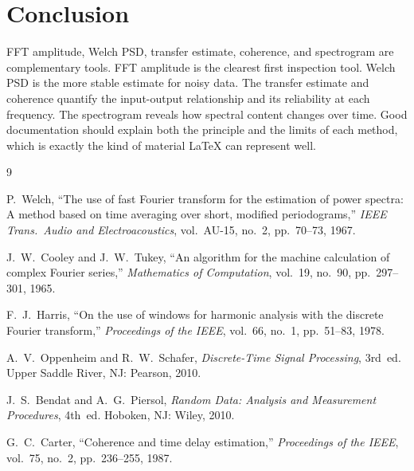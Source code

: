 \documentclass[11pt,a4paper]{article}
\begin{document}
\section{Conclusion}

FFT amplitude, Welch PSD, transfer estimate, coherence, and spectrogram are complementary tools. FFT amplitude is the clearest first inspection tool. Welch PSD is the more stable estimate for noisy data. The transfer estimate and coherence quantify the input-output relationship and its reliability at each frequency. The spectrogram reveals how spectral content changes over time. Good documentation should explain both the principle and the limits of each method, which is exactly the kind of material LaTeX can represent well.

\begin{thebibliography}{9}

P.~Welch,
``The use of fast Fourier transform for the estimation of power spectra: A method based on time averaging over short, modified periodograms,''
\emph{IEEE Trans.\ Audio and Electroacoustics}, vol.~AU-15, no.~2, pp.~70--73, 1967.

J.~W.~Cooley and J.~W.~Tukey,
``An algorithm for the machine calculation of complex Fourier series,''
\emph{Mathematics of Computation}, vol.~19, no.~90, pp.~297--301, 1965.

F.~J.~Harris,
``On the use of windows for harmonic analysis with the discrete Fourier transform,''
\emph{Proceedings of the IEEE}, vol.~66, no.~1, pp.~51--83, 1978.

A.~V.~Oppenheim and R.~W.~Schafer,
\emph{Discrete-Time Signal Processing}, 3rd~ed.
Upper Saddle River, NJ: Pearson, 2010.

J.~S.~Bendat and A.~G.~Piersol,
\emph{Random Data: Analysis and Measurement Procedures}, 4th~ed.
Hoboken, NJ: Wiley, 2010.

G.~C.~Carter,
``Coherence and time delay estimation,''
\emph{Proceedings of the IEEE}, vol.~75, no.~2, pp.~236--255, 1987.

\end{thebibliography}
\end{document}
